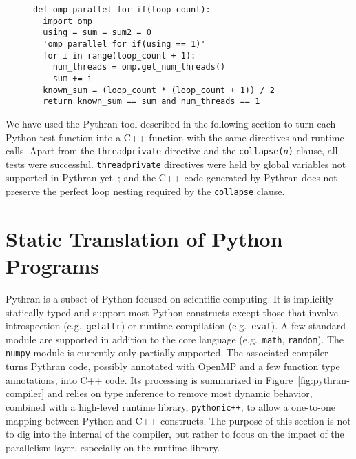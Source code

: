 \documentclass{llncs}
\begin{document}
\begin{figure}
    \begin{lstlisting}[label={lst:openmp-validation},caption={Example of Python
    OpenMP validation test case.}]
def omp_parallel_for_if(loop_count):
  import omp
  using = sum = sum2 = 0
  'omp parallel for if(using == 1)'
  for i in range(loop_count + 1):
    num_threads = omp.get_num_threads()
    sum += i
  known_sum = (loop_count * (loop_count + 1)) / 2
  return known_sum == sum and num_threads == 1
    \end{lstlisting}
\end{figure}

We have used the Pythran tool described in the following section to turn each
Python test function into a C++ function with the same directives and runtime
calls. Apart from the \texttt{threadprivate} directive and the
\texttt{collapse(\emph{n})} clause, all tests were successful.
\texttt{threadprivate} directives were held by global variables not supported in
Pythran yet~; and the C++ code generated by Pythran does not preserve the perfect
loop nesting required by the \texttt{collapse} clause.

\section{Static Translation of Python Programs}\label{sec:python-static}

Pythran is a subset of Python focused on scientific computing. It is implicitly
statically typed and support most Python constructs except those that involve
introspection (e.g.\ \texttt{getattr}) or runtime compilation (e.g.\
\texttt{eval}). A few standard module are supported in addition to the core
language (e.g.\ \texttt{math}, \texttt{random}). The \texttt{numpy} module is
currently only partially supported. The associated compiler turns Pythran code,
possibly annotated with OpenMP and a few function type annotations, into C++
code. Its processing is summarized in Figure~\ref{fig:pythran-compiler} and
relies on type inference to remove most dynamic behavior, combined with a
high-level runtime library, \texttt{pythonic++}, to allow a one-to-one mapping
between Python and C++ constructs. The purpose of this section is not to dig
into the internal of the compiler, but rather to focus on the impact of the
parallelism layer, especially on the runtime library.
\end{document}
